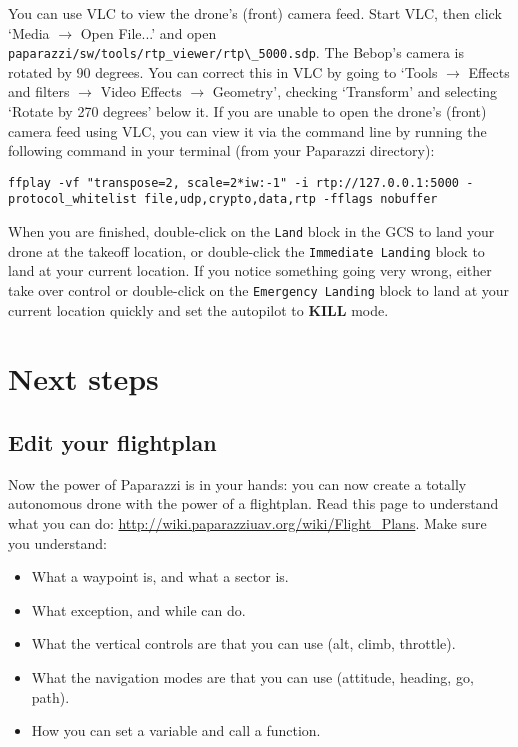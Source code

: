 You can use VLC to view the drone's (front) camera feed. Start VLC, then click `Media $\rightarrow$ Open File...' and open \verb"paparazzi/sw/tools/rtp_viewer/rtp\_5000.sdp".
The Bebop's camera is rotated by 90 degrees. You can correct this in VLC by going to `Tools $\rightarrow$ Effects and filters $\rightarrow$ Video Effects $\rightarrow$ Geometry', checking `Transform' and selecting `Rotate by 270 degrees' below it.
If you are unable to open the drone's (front) camera feed using VLC, you can view it via the command line by running the following command in your terminal (from your Paparazzi directory):
\begin{lstlisting}[style=Bash]
	ffplay -vf "transpose=2, scale=2*iw:-1" -i rtp://127.0.0.1:5000 -protocol_whitelist file,udp,crypto,data,rtp -fflags nobuffer
\end{lstlisting}

When you are finished, double-click on the \texttt{Land} block in the GCS to land your drone at the takeoff location, or double-click the \texttt{Immediate Landing} block to land at your current location. If you notice something going very wrong, either take over control or double-click on the \texttt{Emergency Landing} block to land at your current location quickly and set the autopilot to \textbf{KILL} mode.

\section{Next steps}
\subsection*{Edit your flightplan}
Now the power of Paparazzi is in your hands: you can now create a totally autonomous drone with the power of a flightplan. Read this page to understand what you can do: \url{http://wiki.paparazziuav.org/wiki/Flight_Plans}. 
Make sure you understand:
\begin{itemize}
	\item What a waypoint is, and what a sector is. 
	\item What exception, and while can do. 
	\item What the vertical controls are that you can use (alt, climb, throttle).
	\item What the navigation modes are that you can use (attitude, heading, go, path). 
	\item How you can set a variable and call a function. 
\end{itemize}

